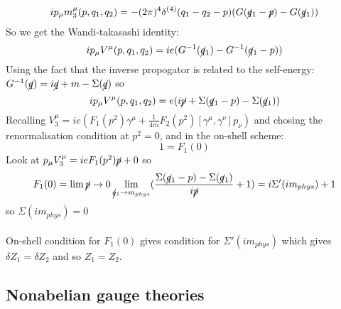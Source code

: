 \documentclass{article}
\begin{document}
$$
 i p_{\mu} m_3^{\mu}( p, q_1, q_2) = - (2\pi)^4 \delta^{(4)} ( q_1 - q_2 - p) ( G( \cancel q_1 - \cancel p) - G( \cancel q_1))
$$
So we get the Wandi-takasashi identity:
$$
i p_{\mu} V^{\mu} ( p, q_1, q_2) = ie ( G^{-1}( \cancel q_1) - G^{-1} ( \cancel q_1 - p) )
$$
Using the fact that the inverse propogator is related to the self-energy: $G^{-1}( \cancel q) = i \cancel q + m - \Sigma (\cancel q)$ so
$$
i p_{\mu} V^{\mu} ( p, q_1, q_2) =  e ( i \cancel p + \Sigma( \cancel q_1 - p) - \Sigma( \cancel q_1))
$$
Recalling $V_3^{\mu} = ie ( F_1( p^2) \gamma^{\mu} + \frac{1}{4m} F_2(p^2) [ \gamma^{\mu}, \gamma^{\nu}]p_{\nu})$ and chosing the renormalisation condition at $p^2 = 0$, and in the on-shell scheme:
$$
1 = F_1(0)
$$
Look at $p_{\mu} V^{\mu}_3 = ie F_1 (p^2) \cancel p + 0$ so $$F_1(0) = \lim{\cancel p \rightarrow 0} \lim_{\cancel q_1 \rightarrow m_{phys}} ( \frac{ \Sigma( \cancel q_1 - p) - \Sigma(\cancel q_1)}{ i \cancel p} + 1) = i\Sigma' ( i m_{phys}) + 1$$ so $\Sigma(i m_{phys}) = 0$\\\\
On-shell condition for $F_1(0)$ gives condition for $\Sigma' ( i m_{phys})$ which gives $\delta Z_1 = \delta Z_2$ and so $Z_1 = Z_2$.
\subsection{Nonabelian gauge theories}
\end{document}
